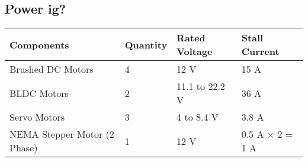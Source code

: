 \documentclass[12pt]{article}
\begin{document}
\subsection*{Power ig?}

\begin{table}[h]
\centering
\begin{tabular}{llll}
\toprule
\textbf{Components} & \textbf{Quantity} & \textbf{Rated Voltage} & \textbf{Stall Current} \\
\midrule
Brushed DC Motors & 4 & 12 V & 15 A \\
BLDC Motors & 2 & 11.1 to 22.2 V & 36 A \\
Servo Motors & 3 & 4 to 8.4 V & 3.8 A \\
NEMA Stepper Motor (2 Phase) & 1 & 12 V & 0.5 A $\times$ 2 = 1 A \\
\bottomrule
\end{tabular}
\end{table}
\end{document}
